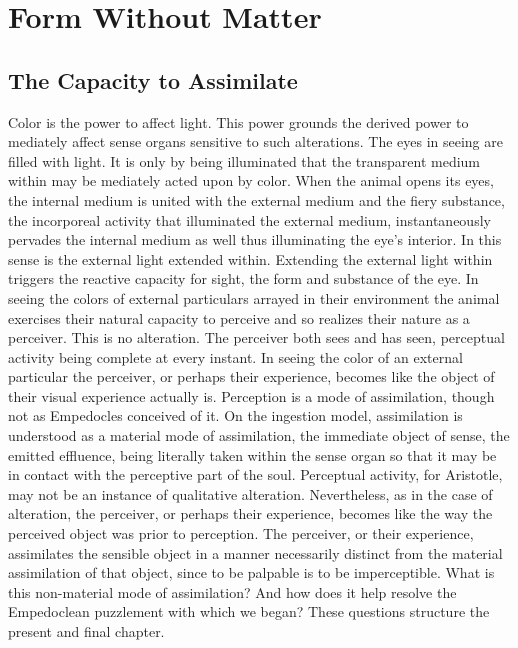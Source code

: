 \chapter{Form Without Matter} %
\label{cha:form_without_matter}

\section{The Capacity to Assimilate} %
\label{sec:the_capacity_to_assimilate}

Color is the power to affect light. This power grounds the derived power to mediately affect sense organs sensitive to such alterations. The eyes in seeing are filled with light. It is only by being illuminated that the transparent medium within may be mediately acted upon by color. When the animal opens its eyes, the internal medium is united with the external medium and the fiery substance, the incorporeal activity that illuminated the external medium, instantaneously pervades the internal medium as well thus illuminating the eye's interior. In this sense is the external light extended within. Extending the external light within triggers the reactive capacity for sight, the form and substance of the eye. In seeing the colors of external particulars arrayed in their environment the animal exercises their natural capacity to perceive and so realizes their nature as a perceiver. This is no alteration. The perceiver both sees and has seen, perceptual activity being complete at every instant. In seeing the color of an external particular the perceiver, or perhaps their experience, becomes like the object of their visual experience actually is. Perception is a mode of assimilation, though not as Empedocles conceived of it. On the ingestion model, assimilation is understood as a material mode of assimilation, the immediate object of sense, the emitted effluence, being literally taken within the sense organ so that it may be in contact with the perceptive part of the soul. Perceptual activity, for Aristotle, may not be an instance of qualitative alteration. Nevertheless, as in the case of alteration, the perceiver, or perhaps their experience, becomes like the way the perceived object was prior to perception. The perceiver, or their experience, assimilates the sensible object in a manner necessarily distinct from the material assimilation of that object, since to be palpable is to be imperceptible. What is this non-material mode of assimilation? And how does it help resolve the Empedoclean puzzlement with which we began? These questions structure the present and final chapter. 

